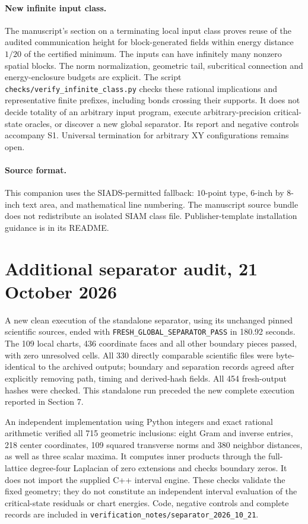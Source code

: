 \documentclass[10pt]{article}
\newcommand{\code}[1]{\nolinkurl{#1}}
\begin{document}
\paragraph{New infinite input class.}
The manuscript's section on a terminating local input class proves
reuse of the audited communication height for block-generated fields
within energy distance $1/20$ of the certified minimum. The inputs can
have infinitely many nonzero spatial blocks. The norm normalization,
geometric tail, subcritical connection and energy-enclosure budgets are
explicit. The script \code{checks/verify_infinite_class.py} checks these
rational implications and representative finite prefixes, including
bonds crossing their supports. It does not decide totality of an
arbitrary input program, execute arbitrary-precision critical-state
oracles, or discover a new global separator. Its report and negative
controls accompany S1. Universal termination for arbitrary XY
configurations remains open.

\paragraph{Source format.}
This companion uses the SIADS-permitted fallback: $10$-point type,
$6$-inch by $8$-inch text area, and mathematical line numbering. The
manuscript source bundle does not redistribute an isolated SIAM class
file. Publisher-template installation guidance is in its README.


\clearpage
\section{Additional separator audit, 21 October 2026}

A new clean execution of the standalone separator, using its unchanged
pinned scientific sources, ended with
\code{FRESH_GLOBAL_SEPARATOR_PASS} in 180.92 seconds. The 109 local
charts, 436 coordinate faces and all other boundary pieces passed, with
zero unresolved cells. All 330 directly comparable scientific files
were byte-identical to the archived outputs; boundary and separation
records agreed after explicitly removing path, timing and derived-hash
fields. All 454 fresh-output hashes were checked. This standalone run
preceded the new complete execution reported in Section 7.

An independent implementation using Python integers and exact rational
arithmetic verified all 715 geometric inclusions: eight Gram and inverse
entries, 218 center coordinates, 109 squared transverse norms and 380
neighbor distances, as well as three scalar maxima. It computes inner
products through the full-lattice degree-four Laplacian of zero
extensions and checks boundary zeros. It does not import the supplied
C++ interval engine. These checks validate the fixed geometry; they do
not constitute an independent interval evaluation of the critical-state
residuals or chart energies. Code, negative controls and complete records
are included in \code{verification_notes/separator_2026_10_21}.
\end{document}

